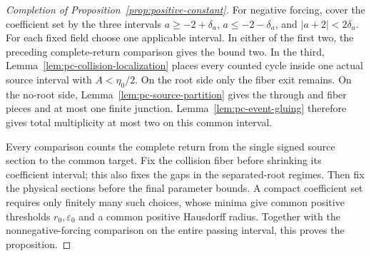 \begin{proof}[Completion of Proposition~\ref{prop:positive-constant}]
For negative forcing, cover the coefficient set by the three intervals
$a\ge-2+\delta_a$, $a\le-2-\delta_a$, and $|a+2|<2\delta_a$.
For each fixed field choose one applicable interval. In either of the
first two, the preceding complete-return comparison gives the bound two.
In the third, Lemma~\ref{lem:pc-collision-localization} places every
counted cycle inside one actual source interval with $A<\eta_0/2$.
On the root side only the fiber exit remains. On the no-root side,
Lemma~\ref{lem:pc-source-partition} gives the through and fiber pieces
and at most one finite junction. Lemma~\ref{lem:pc-event-gluing}
therefore gives total multiplicity at most two on this common interval.

Every comparison counts the complete return from the single signed
source section to the common target. Fix the collision fiber before
shrinking its coefficient interval; this also fixes the gaps in the
separated-root regimes. Then fix the physical sections before the final
parameter bounds. A compact coefficient set requires only finitely many
such choices, whose minima give common positive thresholds
$r_0,\varepsilon_0$ and a common positive Hausdorff radius. Together
with the nonnegative-forcing comparison on the entire passing interval,
this proves the proposition.
\end{proof}

